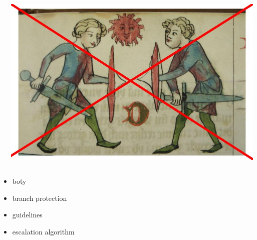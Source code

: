 \documentclass[xcolor=dvipsnames]{beamer}%
\begin{document}
\begin{frame}
\begin{columns}
\begin{column}{0.5\textwidth}
		\end{column}
		\begin{column}{0.5\textwidth}
			\begin{center}
				\includegraphics[width=\textwidth,height=0.8\textheight,keepaspectratio]{figure/sad_bozy.jpg}
			\end{center}
		\end{column}
	\end{columns}
\end{frame}

\begin{frame}
	\begin{itemize}
		\item boty
		\item branch protection
		\item guidelines
		\item escalation algorithm
	\end{itemize}
\end{frame}
\end{document}
